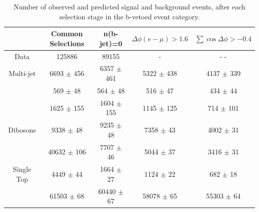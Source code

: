 \begin{table}[tp]
  \centering
   \begin{footnotesize}	
  \begin{tabular}{ccccc}
    \hline\hline
	&	Common Selections			&	n(b-jet)=0			&	$\Delta\phi(e-\mu)>1.6$			&	$\sum\cos\Delta\phi > -0.4$ 		\\	
    \hline
   \hline
Data	&	125886			&	89155			&	-			&	-				-			\\
   \hline
Multi-jet	&	6693	$\pm$	456	&	6357	$\pm$	461	&	5322	$\pm$	438	&	4137	$\pm$	339	\\
\Zll 	&	569	$\pm$	48	&	564	$\pm$	48	&	516	$\pm$	47	&	434	$\pm$	44		\\
\Wlnu	&	1625	$\pm$	155	&	1604	$\pm$	155	&	1145	$\pm$	125	&	714	$\pm$	101		\\
Dibosons	&	9338	$\pm$	48	&	9235	$\pm$	48	&	7358	$\pm$	43	&	4002	$\pm$	31		\\
\ttbar	&	40632	$\pm$	106	&	7707	$\pm$	46	&	5044	$\pm$	37	&	3416	$\pm$	31		\\
Single Top	&	4449	$\pm$	44	&	1664	$\pm$	27	&	1124	$\pm$	22	&	682	$\pm$	18	\\
\Ztautau	&	61503	$\pm$	68	&	60440	$\pm$	67	&	58078	$\pm$	65	&	55303	$\pm$	64	\\
    \hline
  \end{tabular}
  \caption{Number of observed and predicted signal and background events, after each selection stage in the b-vetoed event category.}
  \label{tab:eventsel:bveto}
   \end{footnotesize}	
\end{table}

